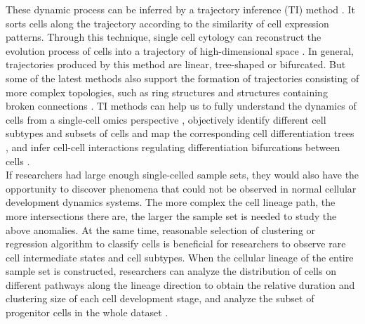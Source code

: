 These dynamic process can be inferred by a trajectory inference (TI) method \parencite{regev_human_2017, nowogrodzki_how_2017}. It sorts cells along the trajectory according to the similarity of cell expression patterns. Through this technique, single cell cytology can reconstruct the evolution process of cells into a trajectory of high-dimensional space 
\parencite{trapnell_defining_2015,cannoodt_computational_2016,moon_manifold_2018}. In general, trajectories produced by this method are linear, tree-shaped or bifurcated. But some of the latest methods also support the formation of trajectories consisting of more complex topologies, such as ring structures 
\parencite{liu_reconstructing_2017} and structures containing broken connections 
\parencite{wolf_paga:_2019}. TI methods can help us to fully understand the dynamics of cells from a single-cell omics perspective \parencite{tanay_scaling_2017}, objectively identify different cell subtypes and subsets of cells \parencite{schlitzer_identification_2015} and map the corresponding cell differentiation trees \parencite{velten_human_2017,see_mapping_2017}, and infer cell-cell interactions regulating differentiation bifurcations between cells 
\parencite{aibar_scenic:_2017}. \\

If researchers had large enough single-celled sample sets, they would also have the opportunity to discover phenomena that could not be observed in normal cellular development dynamics systems. The more complex the cell lineage path, the more intersections there are, the larger the sample set is needed to study the above anomalies. At the same time, reasonable selection of clustering or regression algorithm to classify cells is beneficial for researchers to observe rare cell intermediate states and cell subtypes. When the cellular lineage of the entire sample set is constructed, researchers can analyze the distribution of cells on different pathways along the lineage direction to obtain the relative duration and clustering size of each cell development stage, and analyze the subset of progenitor cells in the whole dataset 
\parencite{regev_human_2017}. 
















